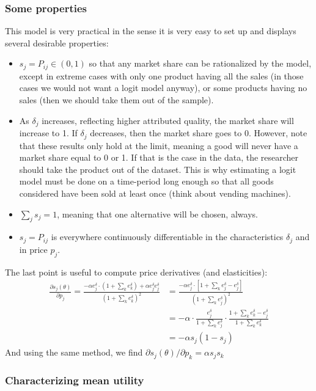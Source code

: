 \subsubsection{Some properties}

This model is very practical in the sense it is very easy to set up and displays several desirable properties:\begin{itemize}
\item $s_j = P_{ij}\in(0,1)$ so that any market share can be rationalized by the model, except in extreme cases with only one product having all the sales (in those cases we would not want a logit model anyway), or some products having no sales (then we should take them out of the sample).
\item As $\delta_{j}$ increases, reflecting higher attributed quality, the market share will increase to 1. If $\delta_j$ decreases, then the market share goes to 0. However, note that these results only hold at the limit, meaning a good will never have a market share equal to 0 or 1. If that is the case in the data, the researcher should take the product out of the dataset. This is why estimating a logit model must be done on a time-period long enough so that all goods considered have been sold at least once (think about vending machines).
\item $\sum_j s_j = 1$, meaning that one alternative will be chosen, always.
\item $s_j = P_{ij}$ is everywhere continuously differentiable in the characteristics $\delta_{j}$ and in price $p_j$.
\end{itemize}

The last point is useful to compute price derivatives (and elasticities): \begin{align*}
\frac{\partial s_j(\theta)}{\partial p_j} = \frac{-\alpha e^\delta_j \cdot (1 + \sum_{k}e^\delta_k ) + \alpha e^\delta_j e^\delta_j }{(1 + \sum_{k} e^\delta_k )^2} & = \frac{-\alpha e^\delta_j\cdot\left[ 1 + \sum_{k}e^\delta_j - e^\delta_j\right]}{(1 + \sum_{k}e^\delta_j)^2} \\ 
& = - \alpha \cdot \frac{e^\delta_j}{1 + \sum_{k}e^\delta_j} \cdot \frac{1 + \sum_{k}e^\delta_k - e^\delta_j}{1 + \sum_{k}e^\delta_k} \\
& = - \alpha s_j (1 - s_j)
\end{align*} And using the same method, we find $\partial s_j(\theta)/\partial p_k = \alpha s_j s_k $

\subsubsection{Characterizing mean utility}

